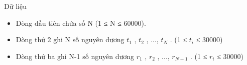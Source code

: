 Dữ liệu
\begin{itemize}
	\item     Dòng đầu tiên chứa số N (1 ≤ N ≤ 60000).   
	\item     Dòng thứ 2 ghi N số nguyên dương $t_{1}$    , $t_{2}$    , ...,   $t_{N}$    . (1 ≤ $t_{i}$    ≤ 30000)   
	\item     Dòng thứ ba ghi N-1 số nguyên dương $r_{1}$    , $r_{2}$    , ...,   $r_{N-1}$    . (1 ≤ $r_{i}$    ≤ 30000)   
\end{itemize}